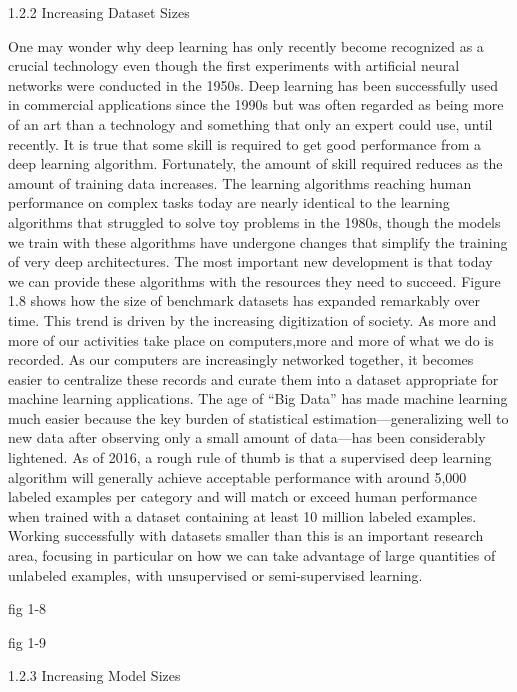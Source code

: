 \documentclass[11pt]{article}
\begin{document}
1.2.2 Increasing Dataset Sizes

One may wonder why deep learning has only recently become recognized as a crucial technology even though the first experiments with artificial neural networks were conducted in the 1950s.
Deep learning has been successfully used in commercial applications since the 1990s but was often regarded as being more of an art than a technology and something that only an expert could use, until recently.
It is true that some skill is required to get good performance from a deep learning algorithm.
Fortunately, the amount of skill required reduces as the amount of training data increases.
The learning algorithms reaching human performance on complex tasks today are nearly identical to the learning algorithms that struggled to solve toy problems in the 1980s, though the models we train with these algorithms have undergone changes that simplify the training of very deep architectures.
The most important new development is that today we can provide these algorithms with the resources they need to succeed.
Figure 1.8 shows how the size of benchmark datasets has expanded remarkably over time.
This trend is driven by the increasing digitization of society.
As more and more of our activities take place on computers,more and more of what we do is recorded.
As our computers are increasingly networked together, it becomes easier to centralize these records and curate them into a dataset appropriate for machine learning applications.
The age of “Big Data” has made machine learning much easier because the key burden of statistical estimation—generalizing well to new data after observing only a small amount of data—has been considerably lightened.
As of 2016, a rough rule of thumb is that a supervised deep learning algorithm will generally achieve acceptable performance with around 5,000 labeled examples per category and will match or exceed human performance when trained with a dataset containing at least 10 million labeled examples.
Working successfully with datasets smaller than this is an important research area, focusing in particular on how we can take advantage of large quantities of unlabeled examples, with unsupervised or semi-supervised learning.

fig 1-8

fig 1-9

1.2.3 Increasing Model Sizes
\end{document}
